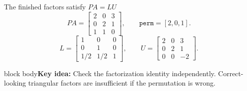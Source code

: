 \documentclass[aspectratio=169,10pt]{beamer}
\newcommand{\takeaway}[1]{\vfill\begin{beamercolorbox}[sep=7pt,wd=\textwidth]{block body}\small\textbf{Key idea:} #1\end{beamercolorbox}}
\begin{document}
\begin{frame}{The finished factors satisfy $PA=LU$}
\centering
\[
 PA=\begin{bmatrix}2&0&3\\0&2&1\\1&1&0\end{bmatrix},
 \qquad \texttt{perm}=[2,0,1].
\]
\vspace{.25cm}
\[
 L=\begin{bmatrix}1&0&0\\0&1&0\\1/2&1/2&1\end{bmatrix},
 \qquad
 U=\begin{bmatrix}2&0&3\\0&2&1\\0&0&-2\end{bmatrix}.
\]
\vspace{.3cm}
\takeaway{Check the factorization identity independently. Correct-looking triangular factors are insufficient if the permutation is wrong.}
\end{frame}
\end{document}
